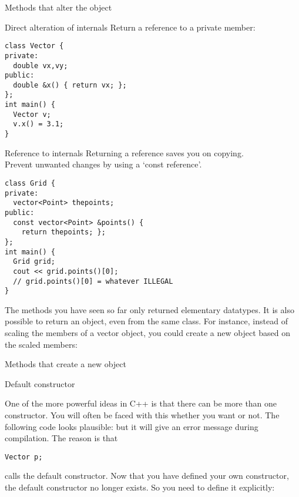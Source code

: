 \begin{slide}{Methods that alter the object}
  \label{sl:obj-func-on}
\end{slide}

\begin{block}{Direct alteration of internals}
  \label{sl:obj-return-ref}
  Return a reference to a private member:
\begin{verbatim}
class Vector {
private:
  double vx,vy;
public:
  double &x() { return vx; };
};
int main() {
  Vector v;
  v.x() = 3.1;
}
\end{verbatim}
\end{block}

\begin{block}{Reference to internals}
  \label{sl:obj-return-const-ref}
  Returning a reference saves you on copying.\\
  Prevent unwanted changes by using a `const reference'.
\begin{verbatim}
class Grid {
private:
  vector<Point> thepoints;
public:
  const vector<Point> &points() {
    return thepoints; };
};
int main() {
  Grid grid;
  cout << grid.points()[0];
  // grid.points()[0] = whatever ILLEGAL
}
\end{verbatim}
\end{block}

The methods you have seen so far only returned elementary
datatypes. It is also possible to return an object, even from the same
class. For instance, instead of scaling the members of a vector object, you
could create a new object based on the scaled members:
%

\begin{slide}{Methods that create a new object}
  \label{sl:obj-return}
\end{slide}

 {Default constructor}

One of the more powerful ideas in C++ is that there can be more than
one constructor. You will often be faced with this whether you want or
not. The following code looks plausible:
%
%
but it will give an error message during compilation. The reason is
that 
\begin{verbatim}
Vector p;
\end{verbatim}
calls the default constructor. Now that you have defined your own
constructor, the default constructor no longer exists. So you need to
define it explicitly:
%

